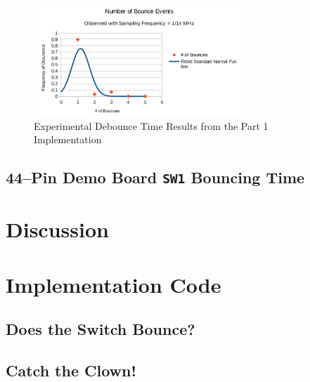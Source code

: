 \documentclass[11pt]{article}
\begin{document}
\begin{figure}
	\centering
	\includegraphics[width=0.7\textwidth]{Figures/debounce-time-results.pdf}
	\caption{Experimental Debounce Time Results from the Part 1 Implementation}
	\label{debounce-time-results}
\end{figure}

\subsection{44--Pin Demo Board \texttt{SW1} Bouncing Time}
\label{part-1-results-section}

\section{Discussion}

\clearpage

\section{Implementation Code}

\subsection{Does the Switch Bounce?}
\label{debounce-time-code}


\clearpage
\subsection{Catch the Clown!}
\label{catch-the-clown-code}

\end{document}
